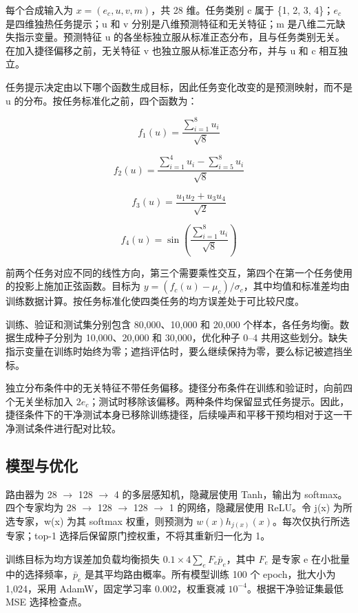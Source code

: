 \documentclass[10pt,letterpaper]{article}
\begin{document}
每个合成输入为 $x=(e_c,u,v,m)$，共 28 维。任务类别 c 属于 \{1, 2, 3, 4\}；$e_{c}$ 是四维独热任务提示；u 和 v 分别是八维预测特征和无关特征；m 是八维二元缺失指示变量。预测特征 u 的各坐标独立服从标准正态分布，且与任务类别无关。在加入捷径偏移之前，无关特征 v 也独立服从标准正态分布，并与 u 和 c 相互独立。


任务提示决定由以下哪个函数生成目标，因此任务变化改变的是预测映射，而不是 u 的分布。按任务标准化之前，四个函数为：


\[
f_1(u)=\frac{\sum_{i=1}^{8}u_i}{\sqrt{8}}
\]

\[
f_2(u)=\frac{\sum_{i=1}^{4}u_i-\sum_{i=5}^{8}u_i}{\sqrt{8}}
\]

\[
f_3(u)=\frac{u_1u_2+u_3u_4}{\sqrt{2}}
\]

\[
f_4(u)=\sin\left(\frac{\sum_{i=1}^{8}u_i}{\sqrt{8}}\right)
\]

前两个任务对应不同的线性方向，第三个需要乘性交互，第四个在第一个任务使用的投影上施加正弦函数。目标为 $y=(f_c(u)-\mu_c)/\sigma_c$，其中均值和标准差均由训练数据计算。按任务标准化使四类任务的均方误差处于可比较尺度。


训练、验证和测试集分别包含 80,000、10,000 和 20,000 个样本，各任务均衡。数据生成种子分别为 10,000、20,000 和 30,000，优化种子 0--4 共用这些划分。缺失指示变量在训练时始终为零；遮挡评估时，要么继续保持为零，要么标记被遮挡坐标。


独立分布条件中的无关特征不带任务偏移。捷径分布条件在训练和验证时，向前四个无关坐标加入 $2e_c$；测试时移除该偏移。两种条件均保留显式任务提示。因此，捷径条件下的干净测试本身已移除训练捷径，后续噪声和平移干预均相对于这一干净测试条件进行配对比较。


\subsection{模型与优化}

路由器为 28 \ensuremath{\rightarrow} 128 \ensuremath{\rightarrow} 4 的多层感知机，隐藏层使用 Tanh，输出为 softmax。四个专家均为 28 \ensuremath{\rightarrow} 128 \ensuremath{\rightarrow} 128 \ensuremath{\rightarrow} 1 的网络，隐藏层使用 ReLU。令 j(x) 为所选专家，w(x) 为其 softmax 权重，则预测为 $w(x)h_{j(x)}(x)$。每次仅执行所选专家；top-1 选择后保留原门控权重，不将其重新归一化为 1。


训练目标为均方误差加负载均衡损失 $0.1\times4\sum_e F_e\bar p_e$，其中 $F_{e}$ 是专家 e 在小批量中的选择频率，$\bar p_e$ 是其平均路由概率。所有模型训练 100 个 epoch，批大小为 1,024，采用 AdamW，固定学习率 0.002，权重衰减 $10^{-4}$。根据干净验证集最低 MSE 选择检查点。
\end{document}
